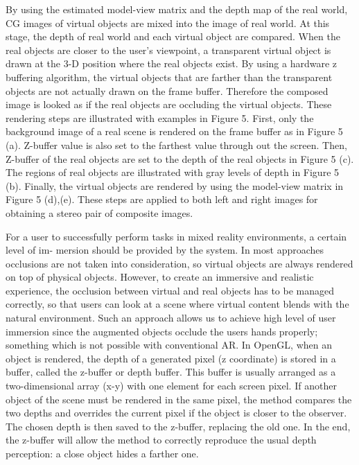 By using the estimated model-view matrix and the depth
map of the real world, CG images of virtual objects are
mixed into the image of real world. At this stage, the depth
of real world and each virtual object are compared. When
the real objects are closer to the user’s viewpoint, a transparent
virtual object is drawn at the 3-D position where the
real objects exist. By using a hardware z buffering algorithm,
the virtual objects that are farther than the transparent
objects are not actually drawn on the frame buffer. Therefore
the composed image is looked as if the real objects are
occluding the virtual objects. These rendering steps are illustrated
with examples in Figure 5.
First, only the background image of a real scene is rendered
on the frame buffer as in Figure 5 (a). Z-buffer value
is also set to the farthest value through out the screen. Then,
Z-buffer of the real objects are set to the depth of the real
objects in Figure 5 (c). The regions of real objects are illustrated
with gray levels of depth in Figure 5 (b). Finally, the
virtual objects are rendered by using the model-view matrix
in Figure 5 (d),(e). These steps are applied to both left and right images for obtaining a stereo pair of composite
images.


For a user to successfully perform tasks in mixed reality environments, a certain level of im- mersion should be provided by the system. In most approaches occlusions are not taken into consideration, so virtual objects are always rendered on top of physical objects. However, to create an immersive and realistic experience, the occlusion between virtual and real objects has to be managed correctly, so that users can look at a scene where virtual content blends with the natural environment. Such an approach allows us to achieve high level of user immersion since the augmented objects occlude the users hands properly; something which is not possible with conventional AR. In OpenGL, when an object is rendered, the depth of a generated pixel (z coordinate) is stored in a buffer, called the z-buffer or depth buffer. This buffer is usually arranged as a two-dimensional array (x-y) with one element for each screen pixel. If another object of the scene must be rendered in the same pixel, the method compares the two depths and overrides the current pixel if the object is closer to the observer. The chosen depth is then saved to the z-buffer, replacing the old one. In the end, the z-buffer will allow the method to correctly reproduce the usual depth perception: a close object hides a farther one.

